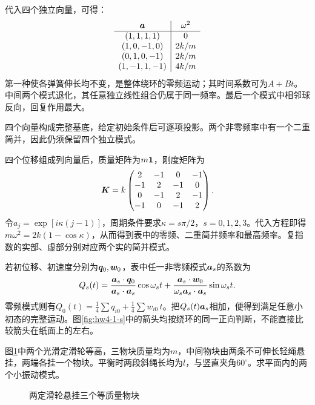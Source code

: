 \begin{solution}
代入四个独立向量，可得：
\[
 \begin{array}{c|c}
 \bm{a}&\omega^2\\\hline
 (1,1,1,1)&0\\
 (1,0,-1,0)&2k/m\\
 (0,1,0,-1)&2k/m\\
 (1,-1,1,-1)&4k/m
 \end{array}
\]
第一种使各弹簧伸长均不变，是整体绕环的零频运动；其时间系数可为$A+Bt$。中间两个模式退化，其任意独立线性组合仍属于同一频率。最后一个模式中相邻球反向，回复作用最大。

四个向量构成完整基底，给定初始条件后可逐项投影。两个非零频率中有一个二重简并，因此仍须保留四个独立模式。


四个位移组成列向量后，质量矩阵为$m\bm{1}$，刚度矩阵为
\[
 \bm{K}=k\begin{pmatrix}
 2&-1&0&-1\\-1&2&-1&0\\0&-1&2&-1\\-1&0&-1&2
 \end{pmatrix}.
\]
令$a_j=\exp[i\kappa(j-1)]$，周期条件要求$\kappa=s\pi/2$，$s=0,1,2,3$。代入方程即得$m\omega^2=2k(1-\cos\kappa)$，从而得到表中的零频、二重简并频率和最高频率。复指数的实部、虚部分别对应两个实的简并模式。

若初位移、初速度分别为$\bm{q}_0,\bm{w}_0$，表中任一非零频模式$\bm{a}_s$的系数为
\[
 Q_s(t)=\frac{\bm{a}_s\cdot\bm{q}_0}{\bm{a}_s\cdot\bm{a}_s}\cos\omega_st
 +\frac{\bm{a}_s\cdot\bm{w}_0}{\omega_s\bm{a}_s\cdot\bm{a}_s}\sin\omega_st.
\]
零频模式则有$Q_0(t)=\tfrac14\sum q_{i0}+\tfrac14\sum w_{i0}\,t$。把$Q_s(t)\bm{a}_s$相加，便得到满足任意小初态的完整运动。图\ref{fig:hw4-1-s}中的箭头均按绕环的同一正向判断，不能直接比较箭头在纸面上的左右。

\end{solution}



\begin{example}[两定滑轮与三等质量物块]\label{ex:hw4-2}

图\ref{fig:hw4-2-q}中两个光滑定滑轮等高，三物块质量均为$m$，中间物块由两条不可伸长轻绳悬挂，两端各挂一个物块。平衡时两段斜绳长均为$l$，与竖直夹角$60^\circ$。求平面内的两个小振动模式。

\end{example}


\begin{figure}[H]\centering
{}
\caption{两定滑轮悬挂三个等质量物块}\label{fig:hw4-2-q}
\end{figure}

